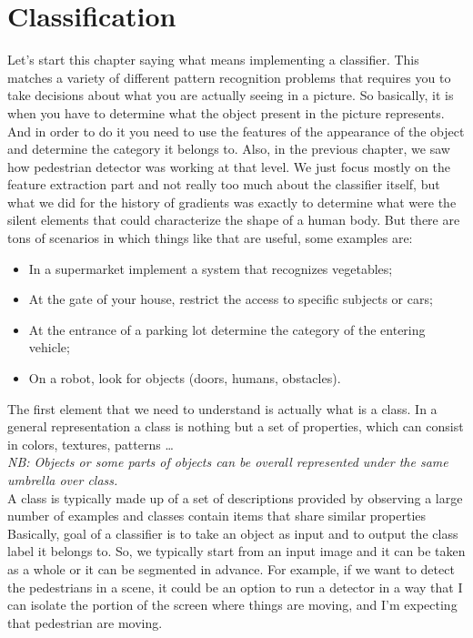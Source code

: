 \chapter{Classification}
Let's start this chapter saying what means implementing a classifier.
This matches a variety of different pattern recognition problems that requires you to take decisions about what you are actually seeing in a picture.
So basically, it is when you have to determine what the object present in the picture represents.
And in order to do it you need to use the features of the appearance of the object and determine the category it belongs to.
Also, in the previous chapter, we saw how pedestrian detector was working at that level. 
We just focus mostly on the feature extraction part and not really too much about the classifier itself, 
but what we did for the history of gradients was exactly to determine what were the silent elements 
that could characterize the shape of a human body. 
But there are tons of scenarios in which things like that are useful, some examples are:
\begin{itemize}
    \item In a supermarket implement a system that recognizes vegetables;
    \item At the gate of your house, restrict the access to specific subjects or cars;
    \item At the entrance of a parking lot determine the category of the entering vehicle;
    \item On a robot, look for objects (doors, humans, obstacles).
\end{itemize}
The first element that we need to understand is actually what is a class.
In a general representation a class is nothing but a set of properties, which can consist in colors, textures, patterns \dots
\\\textit{NB: Objects or some parts of objects can be overall represented under the same umbrella over class.}
\\
A class is typically made up of a set of descriptions provided by observing a large number of examples and classes contain items that share similar properties
Basically, goal of a classifier is to take an object as input and to output the class label it belongs to.
So, we typically start from an input image and it can be taken as a whole or it can be segmented in advance. 
For example, if we want to detect the pedestrians in a scene, it could be an option to run a detector in a way that I can isolate the portion of the screen where things are moving, and I'm expecting that pedestrian are moving.
